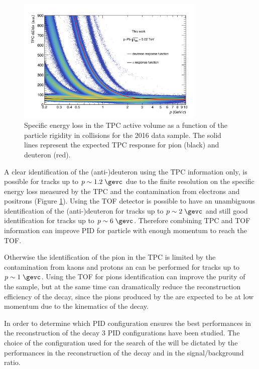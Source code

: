 \begin{figure}
    \centering
    \includegraphics[width=0.8\textwidth]{gfx/pid_tpc}
	\caption{Specific energy loss in the TPC active volume as a function of the particle rigidity in \pPb collisions for the 2016 data sample. The solid lines represent the expected TPC response for pion (black) and deuteron (red).}
	\label{fig:tpc_pid_this}
\end{figure}

A clear identification of the (anti-)deuteron using the TPC information only, is possible for
tracks up to $p \sim 1.2\; \gevc$ due to the finite resolution on the specific energy loss measured by
the TPC and the contamination from electrons and positrons (Figure \ref{fig:tpc_pid_this}).
Using the TOF detector is possible to have an unambiguous identification of the (anti-)deuteron for
tracks up to $p \sim 2\; \gevc$ and still good identification for tracks up to $p \sim 6\; \gevc$.
Therefore combining TPC and TOF information can improve PID for particle with enough momentum to 
reach the TOF.

Otherwise the identification of the pion in the TPC is limited by the contamination from kaons and
protons an can be performed for tracks up to $p \sim 1\; \gevc$. Using the TOF for pions
identification can improve the purity of the sample, but at the same time can dramatically reduce
the reconstruction efficiency of the \ds decay, since the pions produced by the \ds are expected to
be at low momentum due to the kinematics of the decay.

In order to determine which PID configuration ensures the best performances in the reconstruction
of the \ds decay 3 PID configurations have been studied. The choice of the configuration used
for the search of the \ds will be dictated by the performances in the reconstruction of the decay
and in the signal/background ratio.

